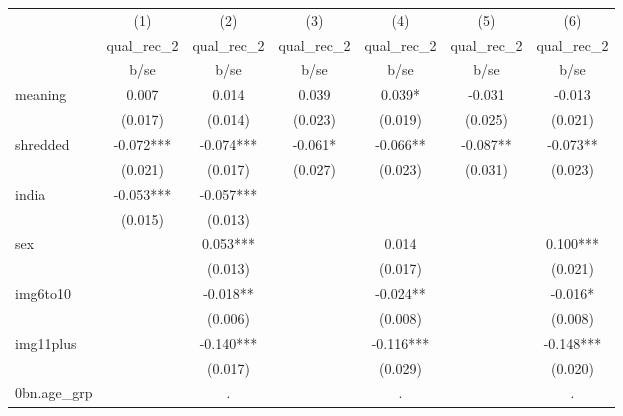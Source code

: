 {
\def\sym#1{\ifmmode^{#1}\else\(^{#1}\)\fi}
\begin{tabular}{l*{6}{c}}
\hline\hline
            &\multicolumn{1}{c}{(1)}&\multicolumn{1}{c}{(2)}&\multicolumn{1}{c}{(3)}&\multicolumn{1}{c}{(4)}&\multicolumn{1}{c}{(5)}&\multicolumn{1}{c}{(6)}\\
            &\multicolumn{1}{c}{qual\_rec\_2}&\multicolumn{1}{c}{qual\_rec\_2}&\multicolumn{1}{c}{qual\_rec\_2}&\multicolumn{1}{c}{qual\_rec\_2}&\multicolumn{1}{c}{qual\_rec\_2}&\multicolumn{1}{c}{qual\_rec\_2}\\
            &        b/se   &        b/se   &        b/se   &        b/se   &        b/se   &        b/se   \\
\hline
meaning     &       0.007   &       0.014   &       0.039   &       0.039*  &      -0.031   &      -0.013   \\
            &     (0.017)   &     (0.014)   &     (0.023)   &     (0.019)   &     (0.025)   &     (0.021)   \\
[1em]
shredded    &      -0.072***&      -0.074***&      -0.061*  &      -0.066** &      -0.087** &      -0.073** \\
            &     (0.021)   &     (0.017)   &     (0.027)   &     (0.023)   &     (0.031)   &     (0.023)   \\
[1em]
india       &      -0.053***&      -0.057***&               &               &               &               \\
            &     (0.015)   &     (0.013)   &               &               &               &               \\
[1em]
sex         &               &       0.053***&               &       0.014   &               &       0.100***\\
            &               &     (0.013)   &               &     (0.017)   &               &     (0.021)   \\
[1em]
img6to10    &               &      -0.018** &               &      -0.024** &               &      -0.016*  \\
            &               &     (0.006)   &               &     (0.008)   &               &     (0.008)   \\
[1em]
img11plus   &               &      -0.140***&               &      -0.116***&               &      -0.148***\\
            &               &     (0.017)   &               &     (0.029)   &               &     (0.020)   \\
[1em]
0bn.age\_grp &               &           .   &               &           .   &               &           .   \\

\end{tabular}}

